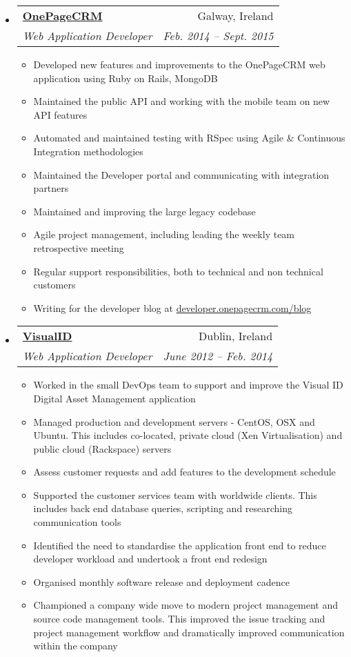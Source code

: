\documentclass[letterpaper,11pt]{article}
\makeatletter
\newcommand{\resitem}[1]{\item #1 \vspace{-2pt}}
\newcommand{\ressubheading}[4]{
\begin{tabular*}{6.5in}{l@{\extracolsep{\fill}}r}
		\textbf{#1} & #2 \\
		\textit{#3} & \textit{#4} \\
\end{tabular*}\vspace{-6pt}}
\makeatother
\begin{document}
\begin{itemize}
	\item 
      \ressubheading{\href{http://www.onepagecrm.com}{OnePageCRM}}{Galway, Ireland}
        {Web Application Developer}{Feb. 2014 -- Sept. 2015}
        {
        \begin{itemize}
          \resitem{Developed new features and improvements to the OnePageCRM web application using Ruby on Rails, MongoDB}
          \resitem{Maintained the public API and working with the mobile team on new API features}
          \resitem{Automated and maintained testing with RSpec using Agile \& Continuous Integration methodologies}
          \resitem{Maintained the Developer portal and communicating with integration partners}
          \resitem{Maintained and improving the large legacy codebase}
          \resitem{Agile project management, including leading the weekly team retrospective meeting}
          \resitem{Regular support responsibilities, both to technical and non technical customers}
          \resitem{Writing for the developer blog at \href{http://developer.onepagecrm.com/blog}{developer.onepagecrm.com/blog}}
        \end{itemize}
        }

		  \item 
      \ressubheading{\href{http://visualid.com}{VisualID}}{Dublin, Ireland}{Web Application Developer}{June 2012 -- Feb. 2014}
        { 
        \begin{itemize}
      	 \resitem{Worked in the small DevOps team to support and improve the Visual ID Digital Asset Management application}
          \resitem{Managed production and development servers - CentOS, OSX and Ubuntu. This includes co-located, private cloud (Xen Virtualisation) and public cloud (Rackspace) servers}
          \resitem{Assess customer requests and add features to the development schedule}
          \resitem{Supported the customer services team with worldwide clients. This includes back end database queries, scripting and researching communication tools}
          \resitem{Identified the need to standardise the application front end to reduce developer workload and undertook a front end redesign}
          \resitem{Organised monthly software release and deployment cadence}
          \resitem{Championed a company wide move to modern project management and source code management tools. This improved the issue tracking and project management workflow and dramatically improved communication within the company}
        \end{itemize}
        }

\end{itemize}  %
\end{document}
